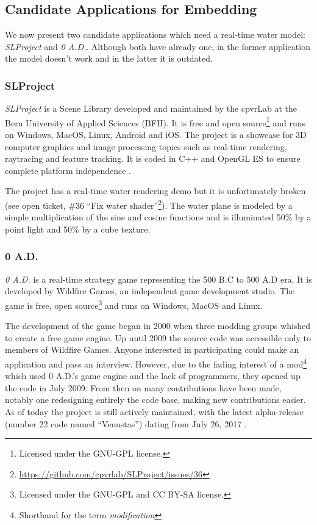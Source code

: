 \subsection{Candidate Applications for Embedding}\label{subsec:candidate_apps}

We now present two candidate applications which need a real-time water model:
\textit{SLProject} and \textit{0 A.D.}. Although both have already one,
in the former application the model doesn't work and in the latter it is
outdated.


\subsubsection{SLProject}

\textit{SLProject} is a Scene Library developed and maintained by the cpvrLab at
the Bern University of Applied Sciences (BFH). It is free and open
source\footnote{Licensed under the GNU-GPL license.} and runs on Windows, MacOS,
Linux, Android and iOS\@. The project is a showcase for 3D computer graphics and
image processing topics such as real-time rendering, raytracing and feature
tracking. It is coded in C++ and OpenGL ES to ensure complete platform
independence \autocite{hudritch2017slproject, slproject2017doxygen}.

The project has a real-time water rendering demo but it is unfortunately broken
(see open ticket, \#36 ``Fix water
shader''\footnote{\url{https://github.com/cpvrlab/SLProject/issues/36}}). The
water plane is modeled by a simple multiplication of the sine and cosine
functions and is illuminated 50\% by a point light and 50\% by a cube texture.


\subsubsection{0 A.D.}

\textit{0 A.D.} is a real-time strategy game representing the 500 B.C to 500 A.D
era. It is developed by Wildfire Games, an independent game development studio.
The game is free, open source\footnote{Licensed under the GNU-GPL and CC BY-SA
license.} and runs on Windows, MacOS and Linux.

The development of the game began in 2000 when three modding groups whished to
create a free game engine. Up until 2009 the source code was accessible only to
members of Wildfire Games. Anyone interested in participating could make an
application and pass an interview. However, due to the fading interest of a
mod\footnote{Shorthand for the term \textit{modification}} which used 0 A.D.'s
game engine and the lack of programmers, they opened up the code in July 2009.
From then on many contributions have been made, notably one redesigning entirely
the code base, making new contributions easier. As of today the project is still
actively maintained, with the latest alpha-release (number 22 code named
``Venustas'') dating from July 26,
2017 \autocite{wildfire0adproject,wildfire0adstory}.

